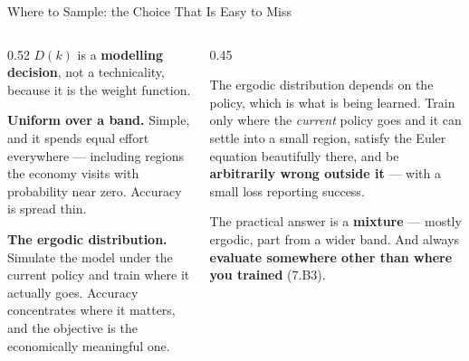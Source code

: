 \begin{frame}{Where to Sample: the Choice That Is Easy to Miss}
\begin{columns}[T]
\begin{column}{0.52\textwidth}
\small
$D(k)$ is a \textbf{modelling decision}, not a technicality, because it is the weight function.
\medskip

\textbf{Uniform over a band.} Simple, and it spends equal effort everywhere --- including regions the economy visits with probability near zero. Accuracy is spread thin.
\medskip

\textbf{The ergodic distribution.} Simulate the model under the current policy and train where it actually goes. Accuracy concentrates where it matters, and the objective is the economically meaningful one.
\end{column}
\begin{column}{0.45\textwidth}
\begin{cautionbox}[title=\textbf{And the trap}]\small
The ergodic distribution depends on the policy, which is what is being learned. Train only where the \emph{current} policy goes and it can settle into a small region, satisfy the Euler equation beautifully there, and be \textbf{arbitrarily wrong outside it} --- with a small loss reporting success.
\end{cautionbox}
\smallskip
{\footnotesize The practical answer is a \textbf{mixture} --- mostly ergodic, part from a wider band. And always \textbf{evaluate somewhere other than where you trained} (7.B3).}
\end{column}
\end{columns}
\vspace{1mm}
\end{frame}

